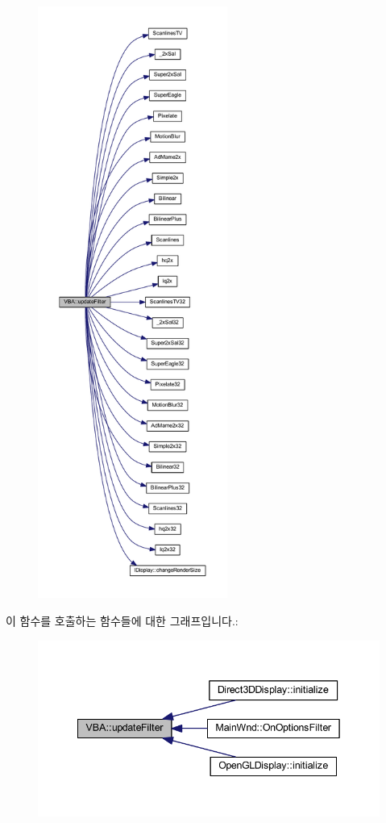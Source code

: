 \begin{figure}[H]
\begin{center}
\leavevmode
\includegraphics[height=550pt]{class_v_b_a_afbe0e6f9458f25adb848516537a91747_cgraph}
\end{center}
\end{figure}
이 함수를 호출하는 함수들에 대한 그래프입니다.\+:
\nopagebreak
\begin{figure}[H]
\begin{center}
\leavevmode
\includegraphics[width=342pt]{class_v_b_a_afbe0e6f9458f25adb848516537a91747_icgraph}
\end{center}
\end{figure}
\mbox{\label{class_v_b_a_a2b3524193d398b041e90907430361ed8}} 
